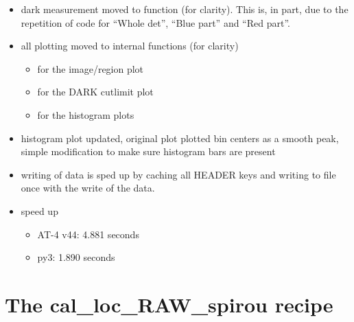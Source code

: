 \begin{itemize}

\item dark measurement moved to function  (for clarity). This is, in part, due to the repetition of code for ``Whole det'', ``Blue part'' and ``Red part''.

\item all plotting moved to internal functions (for clarity)
	\begin{itemize}
    \item {} for the image/region plot
    \item {} for the DARK cutlimit plot
    \item {} for the histogram plots 
    \end{itemize}

\item histogram plot updated, original plot plotted bin centers as a smooth peak, simple modification to make sure histogram bars are present
    
\item writing of data is sped up by caching all HEADER keys and writing to file once with the write of the data.

\item speed up
	\begin{itemize}
	\item AT-4 v44: 4.881 seconds
	\item py3: 1.890 seconds
	\end{itemize}

\end{itemize}

\section{The cal\_loc\_RAW\_spirou recipe}
\label{ch:changelog:At4:cal_loc_RAW_spirou}

